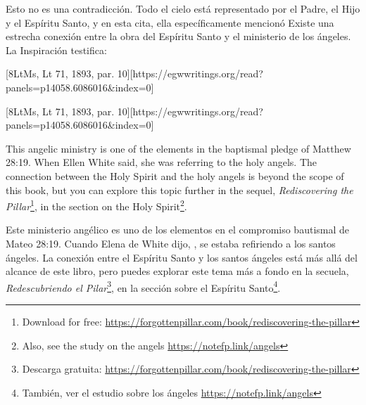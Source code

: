 Esto no es una contradicción. Todo el cielo está representado por el Padre, el Hijo y el Espíritu Santo, y en esta cita, ella específicamente mencionó  Existe una estrecha conexión entre la obra del Espíritu Santo y el ministerio de los ángeles. La Inspiración testifica:


[8LtMs, Lt 71, 1893, par. 10][https://egwwritings.org/read?panels=p14058.6086016&index=0]


[8LtMs, Lt 71, 1893, par. 10][https://egwwritings.org/read?panels=p14058.6086016&index=0]


This angelic ministry is one of the elements in the baptismal pledge of Matthew 28:19. When Ellen White said,  she was referring to the holy angels. The connection between the Holy Spirit and the holy angels is beyond the scope of this book, but you can explore this topic further in the sequel, \textit{Rediscovering the Pillar}\footnote{Download for free: \href{https://forgottenpillar.com/book/rediscovering-the-pillar}{https://forgottenpillar.com/book/rediscovering-the-pillar}}, in the section on the Holy Spirit\footnote{Also, see the study on the angels \href{https://notefp.link/angels}{https://notefp.link/angels}}.


Este ministerio angélico es uno de los elementos en el compromiso bautismal de Mateo 28:19. Cuando Elena de White dijo, , se estaba refiriendo a los santos ángeles. La conexión entre el Espíritu Santo y los santos ángeles está más allá del alcance de este libro, pero puedes explorar este tema más a fondo en la secuela, \textit{Redescubriendo el Pilar}\footnote{Descarga gratuita: \href{https://forgottenpillar.com/book/rediscovering-the-pillar}{https://forgottenpillar.com/book/rediscovering-the-pillar}}, en la sección sobre el Espíritu Santo\footnote{También, ver el estudio sobre los ángeles \href{https://notefp.link/angels}{https://notefp.link/angels}}.






